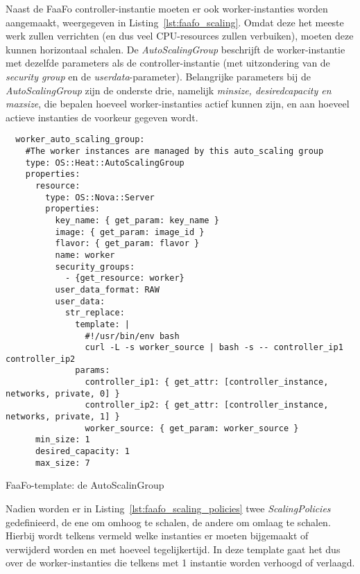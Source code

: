 Naast de FaaFo controller-instantie moeten er ook worker-instanties worden aangemaakt, weergegeven in Listing~\ref{lst:faafo_scaling}. Omdat deze het meeste werk zullen verrichten (en dus veel CPU-resources zullen verbuiken), moeten deze kunnen horizontaal schalen. De \textit{AutoScalingGroup} beschrijft de worker-instantie met dezelfde parameters als de controller-instantie (met uitzondering van de \textit{security group} en de \textit{user\textunderscore data}-parameter). Belangrijke parameters bij de \textit{AutoScalingGroup} zijn de onderste drie, namelijk \textit{min\textunderscore size, desired\textunderscore capacity en max\textunderscore size}, die bepalen hoeveel worker-instanties actief kunnen zijn, en aan hoeveel actieve instanties de voorkeur gegeven wordt.


\begin{code}
\begin{verbatim}
  worker_auto_scaling_group:
    #The worker instances are managed by this auto_scaling group
    type: OS::Heat::AutoScalingGroup
    properties:
      resource:
        type: OS::Nova::Server
        properties:
          key_name: { get_param: key_name }
          image: { get_param: image_id }
          flavor: { get_param: flavor }
          name: worker
          security_groups:
            - {get_resource: worker}
          user_data_format: RAW
          user_data:
            str_replace:
              template: |
                #!/usr/bin/env bash
                curl -L -s worker_source | bash -s -- controller_ip1 controller_ip2
              params:
                controller_ip1: { get_attr: [controller_instance, networks, private, 0] }
                controller_ip2: { get_attr: [controller_instance, networks, private, 1] }
                worker_source: { get_param: worker_source }
      min_size: 1
      desired_capacity: 1
      max_size: 7
\end{verbatim}
\caption{FaaFo-template: de AutoScalinGroup}
\label{lst:faafo_scaling}
\end{code}

Nadien worden er in Listing~\ref{lst:faafo_scaling_policies} twee \textit{ScalingPolicies} gedefinieerd, de ene om omhoog te schalen, de andere om omlaag te schalen. Hierbij wordt telkens vermeld welke instanties er moeten bijgemaakt of verwijderd worden en met hoeveel tegelijkertijd. In deze template gaat het dus over de worker-instanties die telkens met 1 instantie worden verhoogd of verlaagd.

